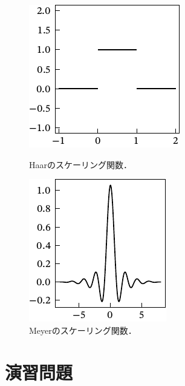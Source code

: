 \documentclass[../../main]{subfiles}
\begin{document}
\begin{figure}[htbp]
  \begin{minipage}{0.5\linewidth}
    \centering
    \includegraphics{figures/haar_scaling}
    \caption{Haarのスケーリング関数．}
  \end{minipage}%
  \begin{minipage}{0.5\linewidth}
    \centering
    \includegraphics{figures/meyer_scaling}
    \caption{Meyerのスケーリング関数．}
  \end{minipage}
\end{figure}

\section*{演習問題}
\end{document}
